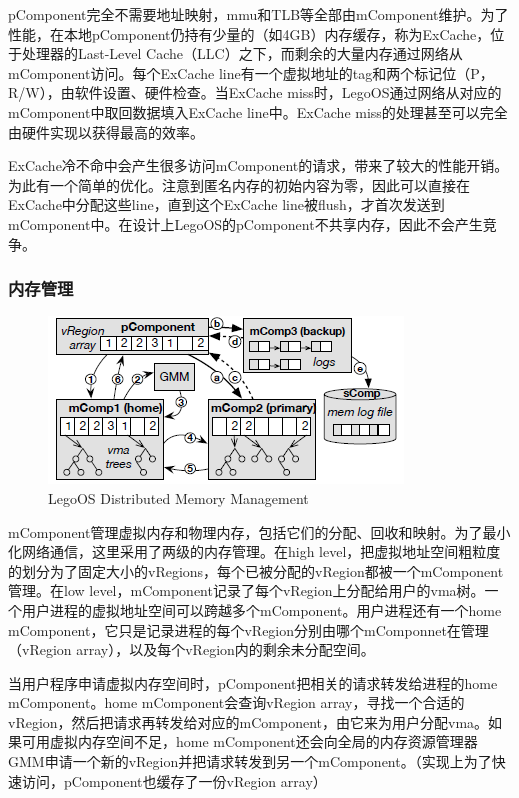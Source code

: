 pComponent完全不需要地址映射，mmu和TLB等全部由mComponent维护。为了性能，在本地pComponent仍持有少量的（如4GB）内存缓存，称为ExCache，位于处理器的Last-Level Cache（LLC）之下，而剩余的大量内存通过网络从mComponent访问。每个ExCache line有一个虚拟地址的tag和两个标记位（P，R/W），由软件设置、硬件检查。当ExCache miss时，LegoOS通过网络从对应的mComponent中取回数据填入ExCache line中。ExCache miss的处理甚至可以完全由硬件实现以获得最高的效率。

ExCache冷不命中会产生很多访问mComponent的请求，带来了较大的性能开销。为此有一个简单的优化。注意到匿名内存的初始内容为零，因此可以直接在ExCache中分配这些line，直到这个ExCache line被flush，才首次发送到mComponent中。在设计上LegoOS的pComponent不共享内存，因此不会产生竞争。

\subsubsection{内存管理}

\begin{figure}[h]
\centering
\includegraphics[scale=1.00]{Figures/legoos/2.png}
\decoRule
\caption{LegoOS Distributed Memory Management}
\label{fig:legoos_memory_management}
\end{figure}

mComponent管理虚拟内存和物理内存，包括它们的分配、回收和映射。为了最小化网络通信，这里采用了两级的内存管理。在high level，把虚拟地址空间粗粒度的划分为了固定大小的vRegions，每个已被分配的vRegion都被一个mComponent管理。在low level，mComponent记录了每个vRegion上分配给用户的vma树。一个用户进程的虚拟地址空间可以跨越多个mComponent。用户进程还有一个home mComponent，它只是记录进程的每个vRegion分别由哪个mComponnet在管理（vRegion array），以及每个vRegion内的剩余未分配空间。

当用户程序申请虚拟内存空间时，pComponent把相关的请求转发给进程的home mComponent。home mComponent会查询vRegion array，寻找一个合适的vRegion，然后把请求再转发给对应的mComponent，由它来为用户分配vma。如果可用虚拟内存空间不足，home mComponent还会向全局的内存资源管理器GMM申请一个新的vRegion并把请求转发到另一个mComponent。（实现上为了快速访问，pComponent也缓存了一份vRegion array）

